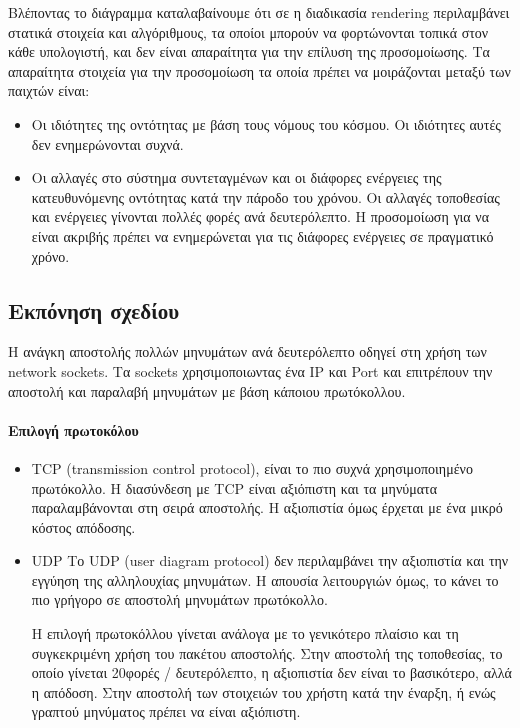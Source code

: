 \documentclass[oneside, 12pt]{book}
\begin{document}
		Βλέποντας το διάγραμμα καταλαβαίνουμε ότι σε η διαδικασία rendering περιλαμβάνει στατικά στοιχεία και αλγόριθμους, τα οποίοι μπορούν να φορτώνονται τοπικά στον κάθε υπολογιστή, και δεν είναι απαραίτητα για την επίλυση της προσομοίωσης. Τα απαραίτητα στοιχεία για την προσομοίωση τα οποία πρέπει να μοιράζονται μεταξύ των παιχτών είναι:
		\begin{itemize}
			\item Oι ιδιότητες της οντότητας με βάση τους νόμους του κόσμου. Οι ιδιότητες αυτές δεν ενημερώνονται συχνά.
			\item Οι αλλαγές στο σύστημα συντεταγμένων και οι διάφορες ενέργειες της κατευθυνόμενης οντότητας κατά την πάροδο του χρόνου. Οι αλλαγές τοποθεσίας και ενέργειες γίνονται πολλές φορές ανά δευτερόλεπτο. Η προσομοίωση για να είναι ακριβής πρέπει να ενημερώνεται για τις διάφορες ενέργειες σε πραγματικό χρόνο.
		\end{itemize}
				
		\subsection{Εκπόνηση σχεδίου}	
		Η ανάγκη αποστολής πολλών μηνυμάτων ανά δευτερόλεπτο οδηγεί στη χρήση των network sockets. Τα sockets χρησιμοποιωντας ένα IP και  Port και επιτρέπουν την αποστολή και παραλαβή μηνυμάτων με βάση κάποιου πρωτόκολλου.
		
		\paragraph{Επιλογή πρωτοκόλου}
		\begin{itemize}	
			\item TCP (transmission control protocol), είναι το πιο συχνά χρησιμοποιημένο πρωτόκολλο. Η διασύνδεση με TCP είναι αξιόπιστη και τα μηνύματα παραλαμβάνονται στη σειρά αποστολής. Η αξιοπιστία όμως έρχεται με ένα μικρό κόστος απόδοσης.
			\item UDP Το UDP (user diagram protocol) δεν περιλαμβάνει την αξιοπιστία και την εγγύηση της αλληλουχίας μηνυμάτων. Η απουσία λειτουργιών όμως, το κάνει το πιο γρήγορο σε αποστολή μηνυμάτων πρωτόκολλο.
			
			Η επιλογή πρωτοκόλλου γίνεται ανάλογα με το γενικότερο πλαίσιο και τη συγκεκριμένη χρήση του πακέτου αποστολής. Στην αποστολή της τοποθεσίας, το οποίο γίνεται 20φορές / δευτερόλεπτο, η αξιοπιστία δεν είναι το βασικότερο, αλλά η απόδοση. Στην αποστολή των στοιχειών του χρήστη κατά την έναρξη, ή ενώς γραπτού μηνύματος πρέπει να είναι αξιόπιστη.
		\end{itemize}
\end{document}
